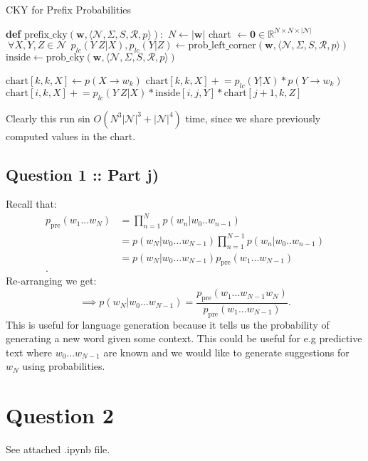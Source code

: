 \documentclass[a4paper]{article}
\begin{document}
\begin{algorithm}
\caption{CKY for Prefix Probabilities}
\begin{algorithmic}
\State  \textbf{def} $\mathrm{prefix\_cky} (\bm{w}, \langle \mathcal{N}, \Sigma, S, \mathcal{R}, p \rangle):$
\State $N \gets \left| \bm{w} \right| $
\State chart $\gets \bm{0} \in \mathbb{R}^{N \times N \times | \mathcal{N}|}$ 
\State $~\forall X, Y, Z \in \mathcal{N} ~ ~ p_{lc}(Y~Z| X), p_{lc}(Y|Z) \gets \text{prob\_left\_corner}(\bm{w}, \langle \mathcal{N}, \Sigma, S, \mathcal{R}, p \rangle)$
\State $\text{inside} \gets \text{prob\_cky}(\bm{w}, \langle \mathcal{N}, \Sigma, S, \mathcal{R}, p \rangle)$

        \State $\text{chart}[k, k, X] \gets p(X \to w_k)$
         
            \State $\text{chart}[k, k, X] \mathrel{+}= p_{lc}(Y|X) * p(Y\to w_k)$
        \EndFor
    \EndFor
\EndFor
{} 
                \State $\text{chart}[i, k, X] \mathrel{+}= p_{lc}(Y~Z|X) * \text{inside}[i,j,Y] * \text{chart}[j+1, k, Z]$
                \EndFor
            \EndFor
        \EndFor
    \EndFor
\EndFor
\State {}
\end{algorithmic}
\end{algorithm}

Clearly this run sin $O(N^3 | \mathcal{N}|^3 + | \mathcal{N}|^4)$ time, since
we share previously computed values in the chart.

\subsection*{Question 1 :: Part j)}
Recall that:
\begin{align*}
     p_{\text{pre}}(w_1...w_N) &=  \prod_{n=1}^{N} p(w_n | w_0 .. w_{n-1})\\ 
 &=  p(w_N | w_0 ... w_{N-1})\prod_{n=1}^{N-1} p(w_n | w_0 .. w_{n-1}) \\ 
 &=  p(w_N | w_0 ... w_{N-1}) p_{\text{pre}}(w_1 ... w_{N-1})\\ 
.
\end{align*}
Re-arranging we get:
\[
\implies p(w_N | w_0 ... w_{N-1}) = \frac{p_{\text{pre}}(w_1 ... w_{N-1} w_N)}{p_{\text{pre}}(w_1 ... w_{N-1})}
.\]
This is useful for language generation because it tells us the probability of generating a new word given some
context. This could be useful for e.g predictive text where $w_0 ... w_{N-1}$ are known and
we would like to generate suggestions for $w_N$ using probabilities.

\section*{Question 2}
See attached .ipynb file.
\end{document}
